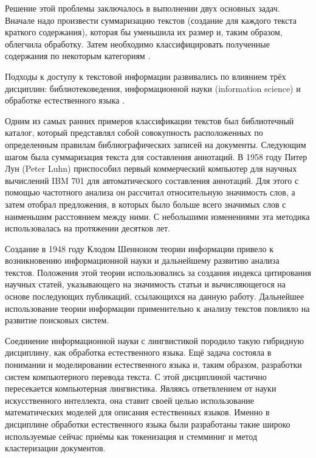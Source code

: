 Решение этой проблемы заключалось в выполнении двух основных задач. Вначале надо произвести суммаризацию текстов (создание для каждого текста краткого содержания), которая бы уменьшила их размер и, таким образом, облегчила обработку. Затем необходимо классифицировать полученные содержания по некоторым категориям \cite[стр. 5]{practical_tm}.

Подходы к доступу к текстовой информации развивались по влиянием трёх дисциплин: библиотековедения, информационной науки (information science) и обработке естественного языка \cite[стр. 5]{practical_tm}.

Одним из самых ранних примеров классификации текстов был библиотечный каталог, который представлял собой совокупность расположенных по определенным правилам библиографических записей на документы. Следующим шагом была суммаризация текста для составления аннотаций. В 1958 году Питер Лун (Peter Luhn) приспособил первый коммерческий компьютер для научных вычислений IBM 701 для автоматического составления аннотаций. Для этого с помощью частотного анализа он рассчитал относительную значимость слов, а затем отобрал предложения, в которых было больше всего значимых слов с наименьшим расстоянием между ними. С небольшими изменениями эта методика использовалась на протяжении десятков лет.

Создание в 1948 году Клодом Шенноном теории информации привело к возникновению информационной науки и дальнейшему развитию анализа текстов. Положения этой теории использовались за создания индекса цитирования научных статей, указывающего на значимость статьи и вычисляющегося на основе последующих публикаций, ссылающихся на данную работу. Дальнейшее использование теории информации применительно к анализу текстов повлияло на развитие поисковых систем.

Соединение информационной науки с лингвистикой породило такую гибридную дисциплину, как обработка естественного языка. Ещё задача состояла в понимании и моделировании естественного языка и, таким образом, разработки систем компьютерного перевода текста. С этой дисциплиной частично пересекается компьютерная лингвистика. Являясь ответвлением от науки искусственного интеллекта, она ставит своей целью использование математических моделей для описания естественных языков. Именно в дисциплине обработки естественного языка были разработаны такие широко используемые сейчас приёмы как токенизация и стемминиг и метод кластеризации документов.

